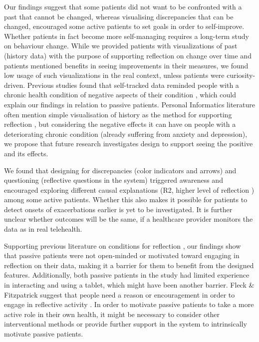 Our findings suggest that some patients did not want to be confronted with a past that cannot be changed, whereas visualising discrepancies that can be changed, encouraged some active patients to set goals in order to self-improve. Whether patients in fact become more self-managing requires a long-term study on behaviour change. While we provided patients with visualizations of past (history data) with the purpose of supporting reflection on change over time \cite{Rivera, Cuttone} and patients mentioned benefits in seeing improvements in their measures, we found low usage of such visualizations in the real context, unless patients were curiosity-driven. Previous studies found that self-tracked data reminded people with a chronic health condition of negative aspects of their condition \cite{Li2010, Ancker2015}, which could explain our findings in relation to passive patients. Personal Informatics literature often mention simple visualisation of history as the method for supporting reflection \cite{Li2011, MacLeod2014, Rivera}, but considering the negative effects it can have on people with a deteriorating chronic condition (already suffering from anxiety and depression), we propose that future research investigates design to support seeing the positive and its effects. 

We found that designing for discrepancies (color indicators and arrows) and questioning (reflective questions in the system) triggered awareness and encouraged exploring different causal explanations (R2, higher level of reflection \cite{Fleck}) among some active patients. Whether this also makes it possible for patients to detect onsets of exacerbations earlier is yet to be investigated. It is further unclear whether outcomes will be the same, if a healthcare provider monitors the data as in real telehealth. 

Supporting previous literature on conditions for reflection \cite{Atkins, Rogers}, our findings show that passive patients were not open-minded or motivated toward engaging in reflection on their data, making it a barrier for them to benefit from the designed features. Additionally, both passive patients in the study had limited experience in interacting and using a tablet, which might have been another barrier. Fleck \& Fitzpatrick suggest that people need a reason or encouragement in order to engage in reflective activity \cite{Fleck}. In order to motivate passive patients to take a more active role in their own health, it might be necessary to consider other interventional methods or provide further support in the system to intrinsically motivate passive patients. 

